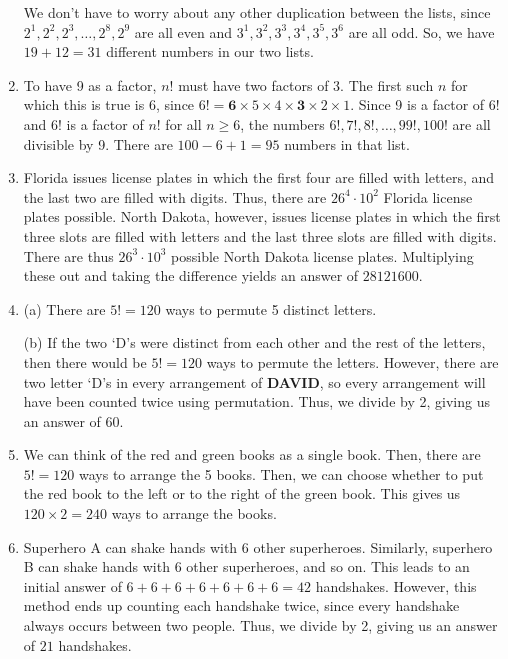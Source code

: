 \documentclass[12pt, letterpaper]{article}
\begin{document}
\begin{enumerate}
    We don't have to worry about any other duplication between the lists, since $\allowbreak 2^1,2^2,2^3,\allowbreak \ldots,2^8,2^9$ are all even and $\allowbreak 3^1,3^2,3^3,\allowbreak 3^4,3^5,3^6$ are all odd. So, we have $19+12 = \boxed{31}$ different numbers in our two lists.
    \item To have 9 as a factor, $n!$ must have two factors of 3. The first such $n$ for which this is true is 6, since  $6! = \textbf{6} \times 5 \times 4 \times \textbf{3} \times 2 \times 1$. Since 9 is a factor of $6!$ and $6!$ is a factor of $n!$ for all $n \ge 6$, the numbers $6!, 7!, 8!, \ldots, 99!, 100!$ are all divisible by 9. There are $100 - 6 + 1 = \boxed{95}$ numbers in that list.
    \item Florida issues license plates in which the first four are filled with letters, and the last two are filled with digits. Thus, there are $26^4 \cdot 10^2$ Florida license plates possible. North Dakota, however, issues license plates in which the first three slots are filled with letters and the last three slots are filled with digits. There are thus $26^3 \cdot 10^3$ possible North Dakota license plates. Multiplying these out and taking the difference yields an answer of $\boxed{28121600}$.
    \item (a) There are $5!=\boxed{120}$ ways to permute 5 distinct letters.
    
    (b) If the two `D's were distinct from each other and the rest of the letters, then there would be $5!=120$ ways to permute the letters. However, there are two letter `D's in every arrangement of \textbf{DAVID}, so every arrangement will have been counted twice using permutation. Thus, we divide by 2, giving us an answer of $\boxed{60}$.
    \item We can think of the red and green books as a single book. Then, there are $5!=120$ ways to arrange the 5 books. Then, we can choose whether to put the red book to the left or to the right of the green book. This gives us $120\times2=\boxed{240}$ ways to arrange the books.
    \item Superhero A can shake hands with 6 other superheroes. Similarly, superhero B can shake hands with 6 other superheroes, and so on. This leads to an initial answer of $6+6+6+6+6+6+6=42$ handshakes. However, this method ends up counting each handshake twice, since every handshake always occurs between two people. Thus, we divide by 2, giving us an answer of $\boxed{21}$ handshakes.
\end{enumerate}
\end{document}
